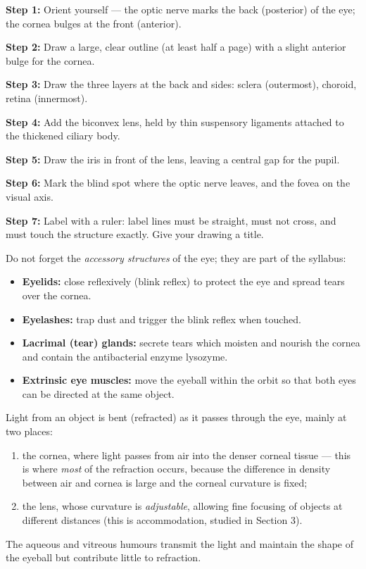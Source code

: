 \documentclass[11pt]{article}
\newcommand{\cle}[1]{{\popxbold\color{popdark}#1}}
\newcounter{popsec}
\newcounter{popsub}
\newcommand{\courssub}[1]{%
  \stepcounter{popsub}%
  \par\vspace{9pt}\noindent{\popxbold\fontsize{11.5}{13}\selectfont\color{popink}{\color{poporange}\thepopsec.\thepopsub}\hspace{6pt}#1}\par\nopagebreak\vspace{4pt}
}
\begin{document}
\begin{methode}
\textbf{Step 1:} Orient yourself --- the \cle{optic nerve} marks the back (posterior) of the eye; the \cle{cornea} bulges at the front (anterior).\par
\textbf{Step 2:} Draw a large, clear outline (at least half a page) with a slight anterior bulge for the cornea.\par
\textbf{Step 3:} Draw the three layers at the back and sides: sclera (outermost), choroid, retina (innermost).\par
\textbf{Step 4:} Add the biconvex \cle{lens}, held by thin \cle{suspensory ligaments} attached to the thickened \cle{ciliary body}.\par
\textbf{Step 5:} Draw the \cle{iris} in front of the lens, leaving a central gap for the \cle{pupil}.\par
\textbf{Step 6:} Mark the \cle{blind spot} where the optic nerve leaves, and the \cle{fovea} on the visual axis.\par
\textbf{Step 7:} Label with a ruler: label lines must be straight, must not cross, and must touch the structure exactly. Give your drawing a title.
\end{methode}

\begin{attention}
Do not forget the \emph{accessory structures} of the eye; they are part of the syllabus:
\begin{itemize}
\item \textbf{Eyelids:} close reflexively (blink reflex) to protect the eye and spread tears over the cornea.
\item \textbf{Eyelashes:} trap dust and trigger the blink reflex when touched.
\item \textbf{Lacrimal (tear) glands:} secrete tears which moisten and nourish the cornea and contain the antibacterial enzyme lysozyme.
\item \textbf{Extrinsic eye muscles:} move the eyeball within the orbit so that both eyes can be directed at the same object.
\end{itemize}
\end{attention}

\courssub{Refraction and Image Formation}

Light from an object is bent (refracted) as it passes through the eye, mainly at two places:
\begin{enumerate}
\item the \cle{cornea}, where light passes from air into the denser corneal tissue --- this is where \emph{most} of the refraction occurs, because the difference in density between air and cornea is large and the corneal curvature is fixed;
\item the \cle{lens}, whose curvature is \emph{adjustable}, allowing fine focusing of objects at different distances (this is \cle{accommodation}, studied in Section 3).
\end{enumerate}
The aqueous and vitreous humours transmit the light and maintain the shape of the eyeball but contribute little to refraction.
\end{document}
